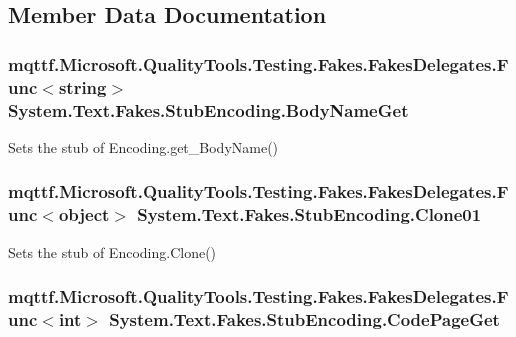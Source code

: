 \subsection{Member Data Documentation}
\hypertarget{class_system_1_1_text_1_1_fakes_1_1_stub_encoding_aea649c6a47dfcac5c88ad59a7a7a109d}{
\subsubsection[{Body\-Name\-Get}]{\setlength{\rightskip}{0pt plus 5cm}mqttf.\-Microsoft.\-Quality\-Tools.\-Testing.\-Fakes.\-Fakes\-Delegates.\-Func$<$string$>$ System.\-Text.\-Fakes.\-Stub\-Encoding.\-Body\-Name\-Get}}\label{class_system_1_1_text_1_1_fakes_1_1_stub_encoding_aea649c6a47dfcac5c88ad59a7a7a109d}


Sets the stub of Encoding.\-get\-\_\-\-Body\-Name()

\hypertarget{class_system_1_1_text_1_1_fakes_1_1_stub_encoding_a16174c00977998bd7d981ad605c9ce66}{
\subsubsection[{Clone01}]{\setlength{\rightskip}{0pt plus 5cm}mqttf.\-Microsoft.\-Quality\-Tools.\-Testing.\-Fakes.\-Fakes\-Delegates.\-Func$<$object$>$ System.\-Text.\-Fakes.\-Stub\-Encoding.\-Clone01}}\label{class_system_1_1_text_1_1_fakes_1_1_stub_encoding_a16174c00977998bd7d981ad605c9ce66}


Sets the stub of Encoding.\-Clone()

\hypertarget{class_system_1_1_text_1_1_fakes_1_1_stub_encoding_aee5934593671ef86f9238d8e4db68d3e}{
\subsubsection[{Code\-Page\-Get}]{\setlength{\rightskip}{0pt plus 5cm}mqttf.\-Microsoft.\-Quality\-Tools.\-Testing.\-Fakes.\-Fakes\-Delegates.\-Func$<$int$>$ System.\-Text.\-Fakes.\-Stub\-Encoding.\-Code\-Page\-Get}}\label{class_system_1_1_text_1_1_fakes_1_1_stub_encoding_aee5934593671ef86f9238d8e4db68d3e}


